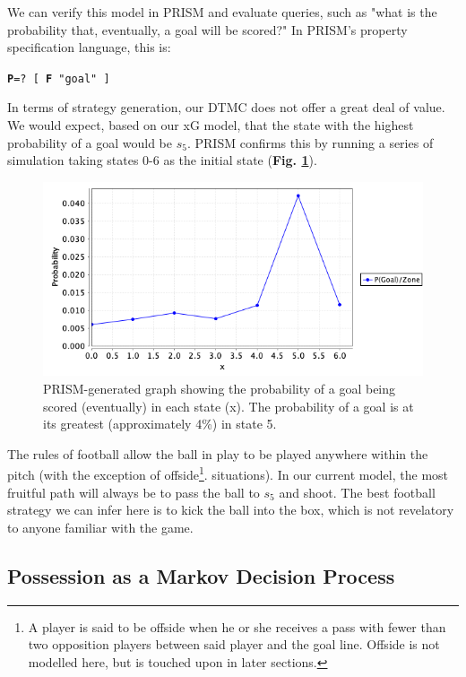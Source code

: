 \documentclass{l4proj}
\begin{document}
We can verify this model in PRISM and evaluate queries, such as "what is the probability that, eventually, a goal will be scored?" In PRISM's property specification language, this is:

\begin{center}
    \texttt{\textbf{P}=? [ \textbf{F} "goal" ]}
\end{center}

In terms of strategy generation, our DTMC does not offer a great deal of value. We would expect, based on our xG model, that the state with the highest probability of a goal would be $s_5$. PRISM confirms this by running a series of simulation taking states 0-6 as the initial state (\textbf{Fig. \ref{fig:sim1}}).

\begin{figure}[h]
    \centering
    \includegraphics[scale=0.6]{images/probabilityofscoring.png}   
    \caption{PRISM-generated graph showing the probability of a goal being scored (eventually) in each state (x). The probability of a goal is at its greatest (approximately 4\%) in state 5.}
    \label{fig:sim1} 
\end{figure}

The rules of football allow the ball in play to be played anywhere within the pitch (with the exception of offside\footnote{A player is said to be offside when he or she receives a pass with fewer than two opposition players between said player and the goal line. Offside is not modelled here, but is touched upon in later sections.}. situations). In our current model, the most fruitful path will always be to pass the ball to $s_5$ and shoot. The best football strategy we can infer here is to kick the ball into the box, which is not revelatory to anyone familiar with the game.

\subsection{Possession as a Markov Decision Process}
\end{document}
